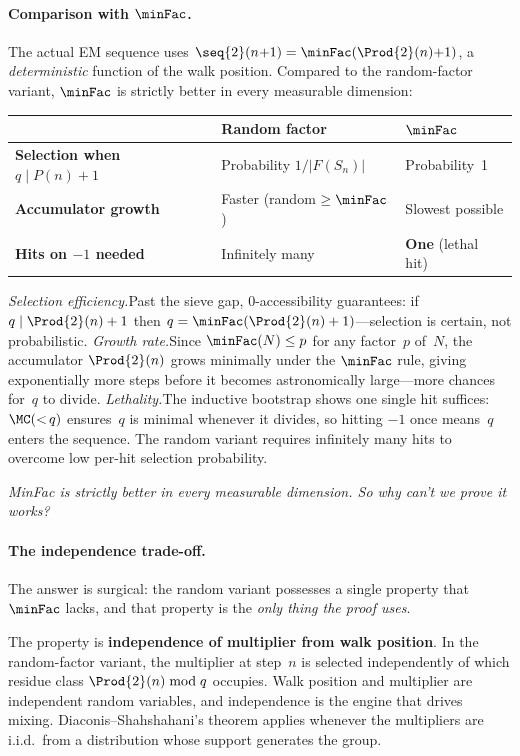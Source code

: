 \paragraph{Comparison with $\minFac$.}
The actual EM sequence uses
$\seq{2}(n{+}1) = \minFac(\Prod{2}(n){+}1)$, a \emph{deterministic}
function of the walk position.  Compared to the random-factor variant,
$\minFac$ is strictly better in every measurable dimension:

\smallskip
\begin{center}
\begin{tabular}{l@{\quad}l@{\quad}l}
\toprule
 & \textbf{Random factor} & $\boldsymbol{\minFac}$ \\
\midrule
\textbf{Selection when $q \mid P(n){+}1$}
  & Probability $1/|F(S_n)|$ & Probability~1 \\
\textbf{Accumulator growth}
  & Faster (random $\geq \minFac$) & Slowest possible \\
\textbf{Hits on $-1$ needed}
  & Infinitely many & \textbf{One} (lethal hit) \\
\bottomrule
\end{tabular}
\end{center}

\smallskip\noindent
\emph{Selection efficiency.}\enspace Past the sieve gap, 0-accessibility
guarantees: if $q \mid \Prod{2}(n)+1$ then
$q = \minFac(\Prod{2}(n)+1)$---selection is certain, not
probabilistic.  \emph{Growth rate.}\enspace Since
$\minFac(N) \leq p$ for any factor~$p$ of~$N$, the accumulator
$\Prod{2}(n)$ grows minimally under the $\minFac$ rule, giving
exponentially more steps before it becomes astronomically large---more
chances for~$q$ to divide.  \emph{Lethality.}\enspace The inductive
bootstrap shows one single hit suffices: $\MC({<}\,q)$ ensures~$q$
is minimal whenever it divides, so hitting $-1$ once means~$q$
enters the sequence.  The random variant requires infinitely many
hits to overcome low per-hit selection probability.

\emph{MinFac is strictly better in every measurable dimension.
So why can't we prove it works?}

\paragraph{The independence trade-off.}
The answer is surgical: the random variant possesses a single property
that $\minFac$ lacks, and that property is the \emph{only thing the
proof uses}.

The property is \textbf{independence of multiplier from walk
position}.  In the random-factor variant, the multiplier at step~$n$
is selected independently of which residue class
$\Prod{2}(n) \bmod q$ occupies.  Walk position and multiplier are
independent random variables, and independence is the engine that
drives mixing.  Diaconis--Shahshahani's theorem applies whenever the
multipliers are i.i.d.\ from a distribution whose support generates
the group.

